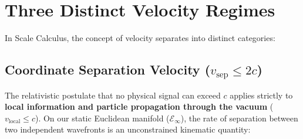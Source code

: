 \documentclass[11pt,a4paper]{article}
\begin{document}
\section{Three Distinct Velocity Regimes}
\label{sec:uc_hiz}

In Scale Calculus, the concept of velocity separates into distinct categories:

\begin{table}[h!]
    \centering
    \small
    \caption{Hierarchy of velocity definitions in Scale-Time Algebra.}
    \label{tab:hiz_hiyerarsisi}
\end{table}

\subsection{Coordinate Separation Velocity (\texorpdfstring{$v_{\mathrm{sep}} \le 2c$}{vsep <= 2c})}
\label{sec:ayrilma_hizi}

The relativistic postulate that no physical signal can exceed $c$ applies strictly to \textbf{local information and particle propagation through the vacuum} ($v_{\mathrm{local}} \le c$). On our static Euclidean manifold ($\mathcal{E}_\infty$), the rate of separation between two independent wavefronts is an unconstrained kinematic quantity:
\end{document}
